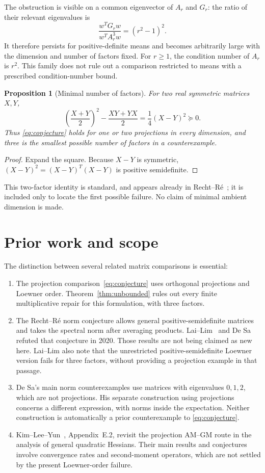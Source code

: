 \documentclass[11pt]{article}
\newtheorem{proposition}[theorem]{Proposition}
\begin{document}
The obstruction is visible on a common eigenvector of $A_r$ and $G_r$: the ratio of their relevant eigenvalues is
\[
 \frac{w^TG_rw}{w^TA_r^3w}=(r^2-1)^2.
\]
It therefore persists for positive-definite means and becomes arbitrarily large with the dimension and number of factors fixed. For $r\ge1$, the condition number of $A_r$ is $r^2$. This family does not rule out a comparison restricted to means with a prescribed condition-number bound.

\begin{proposition}[Minimal number of factors]\label{prop:two}
For two real symmetric matrices $X,Y$,
\[
 \left(\frac{X+Y}{2}\right)^2-\frac{XY+YX}{2}
   =\frac14(X-Y)^2\succeq0.
\]
Thus \eqref{eq:conjecture} holds for one or two projections in every dimension, and three is the smallest possible number of factors in a counterexample.
\end{proposition}

\begin{proof}
Expand the square. Because $X-Y$ is symmetric, $(X-Y)^2=(X-Y)^T(X-Y)$ is positive semidefinite.
\end{proof}

This two-factor identity is standard, and appears already in Recht--R\'e~\cite{recht}; it is included only to locate the first possible failure. No claim of minimal ambient dimension is made.

\section{Prior work and scope}\label{sec:prior}

The distinction between several related matrix comparisons is essential:
\begin{enumerate}[leftmargin=*]
\item The projection comparison~\eqref{eq:conjecture} uses orthogonal projections and Loewner order. Theorem~\ref{thm:unbounded} rules out every finite multiplicative repair for this formulation, with three factors.
\item The Recht--R\'e norm conjecture allows general positive-semidefinite matrices and takes the spectral norm after averaging products. Lai--Lim~\cite{lai} and De Sa~\cite{desa} refuted that conjecture in 2020. Those results are not being claimed as new here. Lai--Lim also note that the unrestricted positive-semidefinite Loewner version fails for three factors, without providing a projection example in that passage.
\item De Sa's main norm counterexamples use matrices with eigenvalues $0,1,2$, which are not projections. His separate construction using projections concerns a different expression, with norms inside the expectation. Neither construction is automatically a prior counterexample to \eqref{eq:conjecture}.
\item Kim--Lee--Yun~\cite{kim}, Appendix~E.2, revisit the projection AM--GM route in the analysis of general quadratic Hessians. Their main results and conjectures involve convergence rates and second-moment operators, which are not settled by the present Loewner-order failure.
\end{enumerate}
\end{document}
